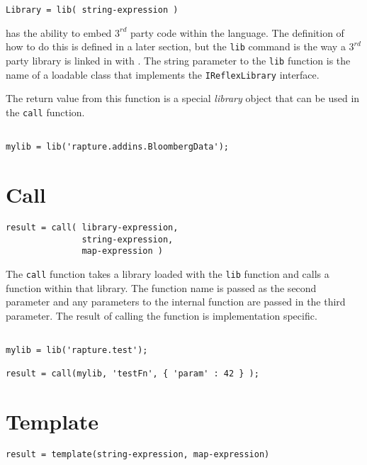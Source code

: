 \begin{Verbatim}
Library = lib( string-expression )
\end{Verbatim}

\Reflex has the ability to embed $3^{rd}$ party code within the language. The definition of how to do this is defined in a later section, but the \Verb+lib+ command is the way a $3^{rd}$ party library is linked in with \Reflex. The string parameter to the \verb+lib+ function is the name of a loadable class that implements the \verb+IReflexLibrary+ interface.

The return value from this function is a special \emph{library} object that can be used in the \Verb+call+ function.

\begin{lstlisting}[caption={Lib example}]

mylib = lib('rapture.addins.BloombergData');

\end{lstlisting}

\section{Call}

\begin{Verbatim}
result = call( library-expression,
               string-expression,
               map-expression )
\end{Verbatim}

The \Verb+call+ function takes a library loaded with the \verb+lib+ function and calls a function within that library. The function name is passed as the second parameter and any parameters to the internal function are passed in the third parameter. The result of calling the function is implementation specific.

\begin{lstlisting}[caption={Call example}]

mylib = lib('rapture.test');

result = call(mylib, 'testFn', { 'param' : 42 } );

\end{lstlisting}

\section{Template}

\begin{Verbatim}
result = template(string-expression, map-expression)
\end{Verbatim}

